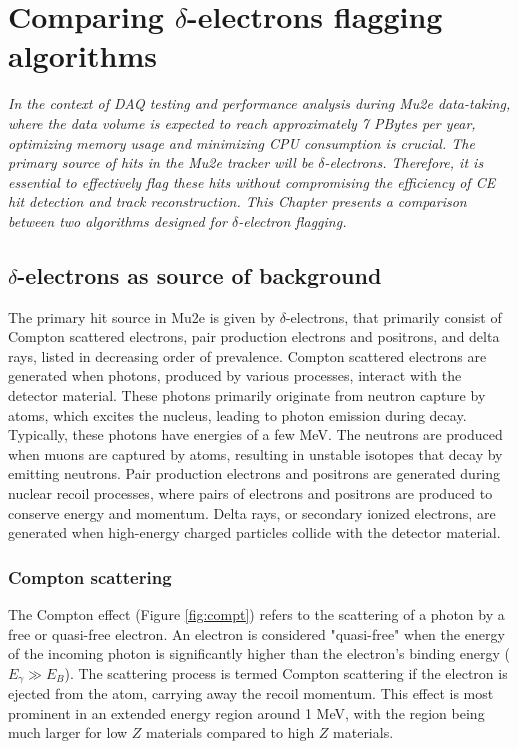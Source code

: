 \chapter{Comparing $\delta$-electrons flagging algorithms}\label{delta}
\textit{In the context of DAQ testing and performance analysis during Mu2e data-taking, 
where the data volume is expected to reach approximately 7 PBytes per year, optimizing 
memory usage and minimizing CPU consumption is crucial. The primary source of hits in the 
Mu2e tracker will be $\delta$-electrons. Therefore, it is essential to effectively flag these 
hits without compromising the efficiency of CE hit detection and track reconstruction. This 
Chapter presents a comparison between two algorithms designed for $\delta$-electron flagging.}

\section{$\delta$-electrons as source of background}

The primary hit source in Mu2e is given by $\delta$-electrons, that  
primarily consist of Compton scattered electrons, pair production 
electrons and positrons, and delta rays, listed in decreasing order of prevalence. Compton 
scattered electrons are generated when photons, produced by various processes, 
interact with the detector material. These photons primarily originate from 
neutron capture by atoms, which excites the nucleus, leading to photon emission 
during decay. Typically, these photons have energies of a few MeV. The neutrons 
are produced when muons are captured by atoms, resulting in unstable isotopes that 
decay by emitting neutrons. Pair production electrons and positrons are generated during nuclear 
recoil processes, where pairs of electrons and positrons are produced to conserve 
energy and momentum. Delta rays, or secondary ionized electrons, are generated when 
high-energy charged particles collide with the detector material.

\subsection{Compton scattering}
The Compton effect (Figure \ref{fig:compt}) refers to the 
scattering of a photon by a free or quasi-free electron. 
An electron is considered "quasi-free" when the energy of 
the incoming photon is significantly higher than the 
electron's binding energy ($E_\gamma \gg E_B$). The 
scattering process is termed Compton scattering if the 
electron is ejected from the atom, carrying away the 
recoil momentum. This effect is most prominent in an 
extended energy region around 1 MeV, with the region 
being much larger for low $Z$ materials compared to high $Z$ materials.


